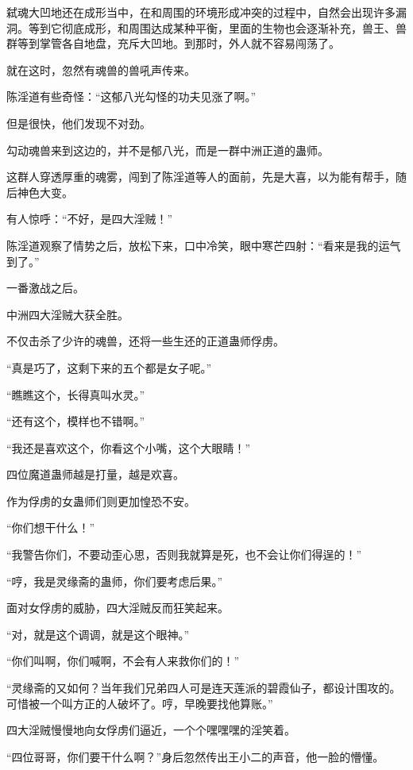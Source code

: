 
\begin{this_body}

弑魂大凹地还在成形当中，在和周围的环境形成冲突的过程中，自然会出现许多漏洞。等到它彻底成形，和周围达成某种平衡，里面的生物也会逐渐补充，兽王、兽群等到掌管各自地盘，充斥大凹地。到那时，外人就不容易闯荡了。

就在这时，忽然有魂兽的兽吼声传来。

陈淫道有些奇怪：“这郁八光勾怪的功夫见涨了啊。”

但是很快，他们发现不对劲。

勾动魂兽来到这边的，并不是郁八光，而是一群中洲正道的蛊师。

这群人穿透厚重的魂雾，闯到了陈淫道等人的面前，先是大喜，以为能有帮手，随后神色大变。

有人惊呼：“不好，是四大淫贼！”

陈淫道观察了情势之后，放松下来，口中冷笑，眼中寒芒四射：“看来是我的运气到了。”

一番激战之后。

中洲四大淫贼大获全胜。

不仅击杀了少许的魂兽，还将一些生还的正道蛊师俘虏。

“真是巧了，这剩下来的五个都是女子呢。”

“瞧瞧这个，长得真叫水灵。”

“还有这个，模样也不错啊。”

“我还是喜欢这个，你看这个小嘴，这个大眼睛！”

四位魔道蛊师越是打量，越是欢喜。

作为俘虏的女蛊师们则更加惶恐不安。

“你们想干什么！”

“我警告你们，不要动歪心思，否则我就算是死，也不会让你们得逞的！”

“哼，我是灵缘斋的蛊师，你们要考虑后果。”

面对女俘虏的威胁，四大淫贼反而狂笑起来。

“对，就是这个调调，就是这个眼神。”

“你们叫啊，你们喊啊，不会有人来救你们的！”

“灵缘斋的又如何？当年我们兄弟四人可是连天莲派的碧霞仙子，都设计围攻的。可惜被一个叫方正的人破坏了。哼，早晚要找他算账。”

四大淫贼慢慢地向女俘虏们逼近，一个个嘿嘿嘿的淫笑着。

“四位哥哥，你们要干什么啊？”身后忽然传出王小二的声音，他一脸的懵懂。


\end{this_body}
